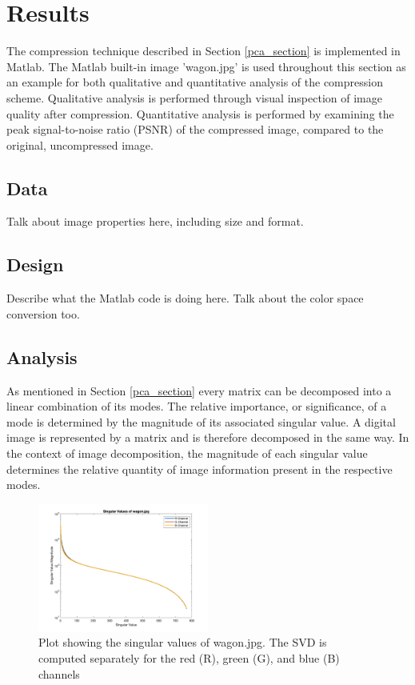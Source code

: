 \documentclass[conference]{IEEEtran}
\begin{document}
    \section{Results}

    The compression technique described in Section \ref{pca_section} is implemented in Matlab. The Matlab built-in image 'wagon.jpg' is used throughout this section as an example for both qualitative and quantitative analysis of the compression scheme. Qualitative analysis is performed through visual inspection of image quality after compression. Quantitative analysis is performed by examining the peak signal-to-noise ratio (PSNR) of the compressed image, compared to the original, uncompressed image.

    \subsection{Data}
    Talk about image properties here, including size and format.

    \subsection{Design}
    Describe what the Matlab code is doing here. Talk about the color space conversion too.

    \subsection{Analysis}
    As mentioned in Section \ref{pca_section} every matrix can be decomposed into a linear combination of its modes. The relative importance, or significance, of a mode is determined by the magnitude of its associated singular value. A digital image is represented by a matrix and is therefore decomposed in the same way. In the context of image decomposition, the magnitude of each singular value determines the relative quantity of image information present in the respective modes.

    \begin{figure}[t]
    \includegraphics[width=0.5\textwidth]{svals_wagon_rgb}
    \caption{Plot showing the singular values of wagon.jpg. The SVD is computed separately for the red (R), green (G), and blue (B) channels}
    \label{fig:svalplot}
    \end{figure}
    
\end{document}
